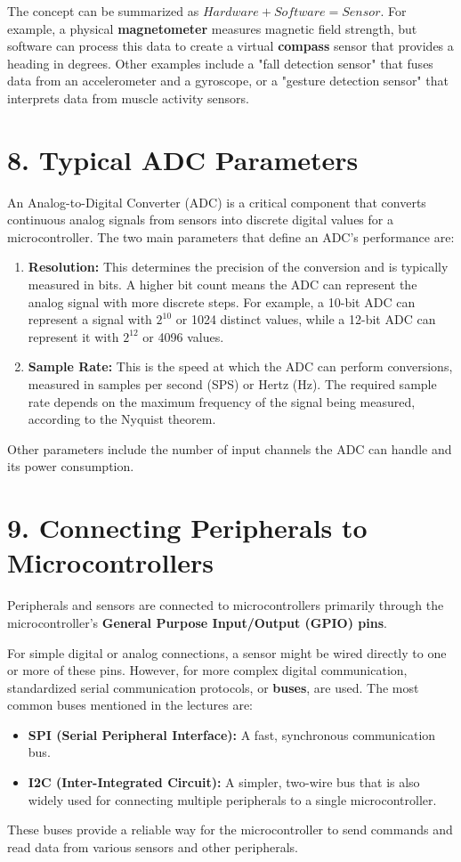\documentclass[a4paper,12pt]{article}
\begin{document}
The concept can be summarized as \textbf{$Hardware + Software = Sensor$}. For example, a physical \textbf{magnetometer} measures magnetic field strength, but software can process this data to create a virtual \textbf{compass} sensor that provides a heading in degrees. Other examples include a "fall detection sensor" that fuses data from an accelerometer and a gyroscope, or a "gesture detection sensor" that interprets data from muscle activity sensors. 

\section*{8. Typical ADC Parameters}

An Analog-to-Digital Converter (ADC) is a critical component that converts continuous analog signals from sensors into discrete digital values for a microcontroller. The two main parameters that define an ADC's performance are: 
\begin{enumerate}
    \item \textbf{Resolution:} This determines the precision of the conversion and is typically measured in bits. A higher bit count means the ADC can represent the analog signal with more discrete steps. For example, a 10-bit ADC can represent a signal with $2^{10}$ or 1024 distinct values, while a 12-bit ADC can represent it with $2^{12}$ or 4096 values.
    \item \textbf{Sample Rate:} This is the speed at which the ADC can perform conversions, measured in samples per second (SPS) or Hertz (Hz). The required sample rate depends on the maximum frequency of the signal being measured, according to the Nyquist theorem.
\end{enumerate}
Other parameters include the number of input channels the ADC can handle and its power consumption. 

\section*{9. Connecting Peripherals to Microcontrollers}

Peripherals and sensors are connected to microcontrollers primarily through the microcontroller's \textbf{General Purpose Input/Output (GPIO) pins}. 

For simple digital or analog connections, a sensor might be wired directly to one or more of these pins. However, for more complex digital communication, standardized serial communication protocols, or \textbf{buses}, are used. The most common buses mentioned in the lectures are: 
\begin{itemize}
    \item \textbf{SPI (Serial Peripheral Interface):} A fast, synchronous communication bus.
    \item \textbf{I2C (Inter-Integrated Circuit):} A simpler, two-wire bus that is also widely used for connecting multiple peripherals to a single microcontroller.
\end{itemize}
These buses provide a reliable way for the microcontroller to send commands and read data from various sensors and other peripherals. 
\end{document}
